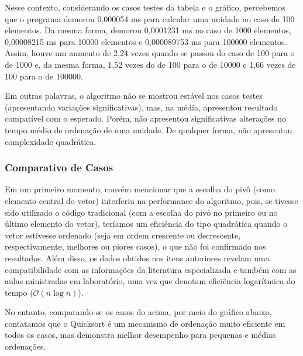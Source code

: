 \documentclass[a4paper, 12pt]{article}
\begin{document}
Nesse contexto, considerando os casos testes da tabela e o gráfico, percebemos que o programa demorou 0,000054 ms para calcular uma unidade no caso de 100 elementos. Da mesma forma, demorou 0,0001231 ms no caso de 1000 elementos, 0,00008215 ms para 10000 elementos e 0,000089753 ms para 100000 elementos. Assim, houve um aumento de 2,24 vezes quando se passou do caso de 100 para o de 1000 e, da mesma forma, 1,52 vezes do de 100 para o de 10000 e 1,66 vezes de 100 para o de 100000.

Em outras palavras, o algoritmo não se mostrou estável nos casos testes (apresentando variações significativas), mas, na média, apresentou resultado compatível com o esperado. Porém, não apresentou significativas alterações no tempo médio de ordenação de uma unidade. De qualquer forma, não apresentou complexidade quadrática.

\vspace{0.6cm}
\subsubsection{Comparativo de Casos}

\tab{ }Em um primeiro momento, convém mencionar que a escolha do pivô (como elemento central do vetor) interferiu na performance do algoritmo, pois, se tivesse sido utilizado o código tradicional (com a escolha do pivô no primeiro ou no último elemento do vetor), teríamos um eficiência do tipo quadrática quando o vetor estivesse ordenado (seja em ordem crescente ou decrescente, respectivamente, melhores ou piores casos), o que não foi confirmado nos resultados. Além disso, os dados obtidos nos itens anteriores revelam uma compatibilidade com as informações da literatura especializada e também com as aulas ministradas em laboratório, uma vez que denotam eficiência logarítmica do tempo ($\mathcal{O} (n\log{}n)$).

No entanto, comparando-se os casos do acima, por meio do gráfico abaixo, contatamos que o Quicksort é um mecanismo de ordenação muito eficiente em todos os casos, mas demonstra melhor desempenho para pequenas e médias ordenações. 

\begin{center}
\end{center}
\end{document}
